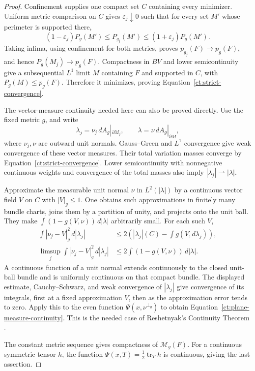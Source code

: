 \begin{proof}
Confinement supplies one compact set $C$ containing every minimizer.
Uniform metric comparison on $C$ gives $\varepsilon_j\downarrow0$
such that for every set $M'$ whose perimeter is supported there,
\begin{equation}
\label{ct:uniform-perimeter-comparison}
 (1-\varepsilon_j)P_g(M')\leq P_{g_j}(M')
 \leq(1+\varepsilon_j)P_g(M').
\end{equation}
Taking infima, using confinement for both metrics, proves
$p_{g_j}(F)\to p_g(F)$, and hence $P_g(M_j)\to p_g(F)$.
Compactness in $BV$ and lower semicontinuity give a subsequential
$L^1$ limit $M$ containing $F$ and supported in $C$, with
$P_g(M)\leq p_g(F)$. Therefore it minimizes, proving
Equation~\ref{ct:strict-convergence}.

The vector-measure continuity needed here can also be proved directly.
Use the fixed metric $g$, and write
\[
 \lambda_j=\nu_j\,dA_g|_{\partial M_j},\qquad
 \lambda=\nu\,dA_g|_{\partial M},
\]
where $\nu_j,\nu$ are outward unit normals. Gauss--Green and $L^1$
convergence give weak convergence of these vector measures.
Their total variation masses converge by
Equation~\ref{ct:strict-convergence}. Lower semicontinuity with
nonnegative continuous weights and convergence of the total masses
also imply $|\lambda_j|\rightharpoonup|\lambda|$.

Approximate the measurable unit normal $\nu$ in $L^2(|\lambda|)$ by
a continuous vector field $V$ on $C$ with $|V|_g\leq1$. One obtains
such approximations in finitely many bundle charts, joins them by a
partition of unity, and projects onto the unit ball. They make
$\int(1-g(V,\nu))\,d|\lambda|$ arbitrarily small. For each such $V$,
\begin{align*}
 \int|\nu_j-V|_g^2\,d|\lambda_j|
 &\leq2\left(|\lambda_j|(C)-\int g(V,d\lambda_j)\right),\\
 \limsup_j\int|\nu_j-V|_g^2\,d|\lambda_j|
 &\leq2\int(1-g(V,\nu))\,d|\lambda|.
\end{align*}
A continuous function of a unit normal extends continuously to the
closed unit-ball bundle and is uniformly continuous on that compact
bundle. The displayed estimate, Cauchy--Schwarz, and weak convergence
of $|\lambda_j|$ give convergence of its integrals, first at a fixed
approximation $V$, then as the approximation error tends to zero.
Apply this to the even function $\Psi(x,\nu^{\perp_g})$ to obtain
Equation~\ref{ct:plane-measure-continuity}. This is the needed case of
Reshetnyak's Continuity Theorem
\cite[Theorem~2.39]{AmbrosioFuscoPallara2000}.

The constant metric sequence gives compactness of $\mathcal M_g(F)$.
For a continuous symmetric tensor $h$, the function
$\Psi(x,T)=\tfrac12\operatorname{tr}_T h$ is continuous, giving the
last assertion.
\end{proof}

